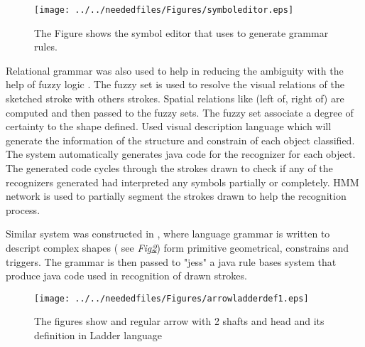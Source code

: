 \begin{figure}
	\centering
		\texttt{[image: ../../neededfiles/Figures/symboleditor.eps]}
	\caption[symbol editor]{The Figure shows the symbol editor that\cite{XPGParser59} uses to generate grammar rules.}
	\label{fig:symboleditor}
\end{figure}

Relational grammar was also used to help in reducing the ambiguity with the help of fuzzy logic\cite {visualpattern43} . The fuzzy set is used to resolve the visual relations of the sketched stroke with others strokes. Spatial relations like (left of, right of) are computed and then passed to the fuzzy sets. The fuzzy set associate a degree of certainty to the shape defined. 
\cite{Ladder30,GenericHMM28}  Used visual description language which will generate the information of the structure and constrain of each object classified. The system automatically generates java code for the recognizer for each object. The generated code cycles through the strokes drawn to check if any of the recognizers generated had interpreted any symbols partially or completely. HMM network is used to partially segment the strokes drawn to help the recognition process. 

Similar system was constructed in \cite {Ladder30} , where language grammar is written to descript complex shapes ( see \textit{Fig\ref{fig:arrowladderdef1}}) form primitive geometrical, constrains and triggers. The grammar is then passed to "jess" a java rule bases system that produce java code used in recognition of  drawn strokes.

\begin{figure}
	\centering
	\begin {center}
			\centering

			{\label {fig:arrow1}\texttt{[image: ../../neededfiles/Figures/arrowladderdef1.eps]}}
		\end {center}
	\caption[Arrow definition]{The figures show and regular arrow with 2 shafts and head and its definition in Ladder language \cite{Ladder30}}
	\label{fig:arrowladderdef1}
\end{figure}








